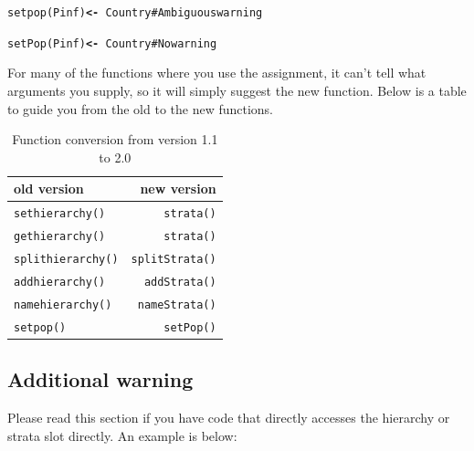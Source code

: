 \documentclass[letterpaper]{article}\usepackage[]{graphicx}\usepackage[]{color}
\makeatletter
\newcommand{\hlcom}[1]{\textcolor[rgb]{1,0.502,0}{#1}}%
\newcommand{\hlopt}[1]{\textcolor[rgb]{1,0,0.502}{\textbf{#1}}}%
\newcommand{\hlstd}[1]{\textcolor[rgb]{0,0,0}{#1}}%
\newcommand{\hlkwb}[1]{\textcolor[rgb]{0.502,0.502,0.753}{\textbf{#1}}}%
\newcommand{\hlkwd}[1]{\textcolor[rgb]{0,0.267,0.4}{#1}}%
\newenvironment{kframe}{%
 \def\at@end@of@kframe{}%
 \ifinner\ifhmode%
  \def\at@end@of@kframe{\end{minipage}}%
  \begin{minipage}{\columnwidth}%
 \fi\fi%
 \def\FrameCommand##1{\hskip\@totalleftmargin \hskip-\fboxsep
 \colorbox{shadecolor}{##1}\hskip-\fboxsep
     \hskip-\linewidth \hskip-\@totalleftmargin \hskip\columnwidth}%
 \MakeFramed {\advance\hsize-\width
   \@totalleftmargin\z@ \linewidth\hsize
   \@setminipage}}%
 {\par\unskip\endMakeFramed%
 \at@end@of@kframe}
\newenvironment{knitrout}{}{} %
\makeatother
\begin{document}
\begin{knitrout}
\color{fgcolor}\begin{kframe}
\begin{alltt}
\hlkwd{setpop}\hlstd{(Pinf)} \hlkwb{<-} \hlopt{~}\hlstd{Country} \hlcom{# Ambiguous warning}
\end{alltt}


{\ttfamily\noindent\color{warningcolor}{\#\# Warning: 'setpop' has been deprecated, moved to the adegenet package, and renamed to 'setPop'.\\\#\# \\\#\#\ \ Please use:\\\#\#\ \ setPop()}}\begin{alltt}
\hlkwd{setPop}\hlstd{(Pinf)} \hlkwb{<-} \hlopt{~}\hlstd{Country} \hlcom{# No warning}
\end{alltt}
\end{kframe}
\end{knitrout}

For many of the functions where you use the assignment, it can't tell what 
arguments you supply, so it will simply suggest the new function. Below is a 
table to guide you from the old to the new functions. 

\begin{table}[h]
\centering
\label{stratatable}
\begin{tabular}{lr}
\textbf{old version} & \textbf{new version} \\ \hline
\texttt{sethierarchy()} & \texttt{strata()} \\ 
\texttt{gethierarchy()} & \texttt{strata()} \\ 
\texttt{splithierarchy()} & \texttt{splitStrata()} \\ 
\texttt{addhierarchy()} & \texttt{addStrata()} \\ 
\texttt{namehierarchy()} & \texttt{nameStrata()} \\ 
\texttt{setpop()} & \texttt{setPop()} \\ \hline
\end{tabular}
\caption{Function conversion from version 1.1 to 2.0}
\end{table}


\subsection{Additional warning}

Please read this section if you have code that directly accesses the hierarchy
or strata slot directly. An example is below:
\end{document}
